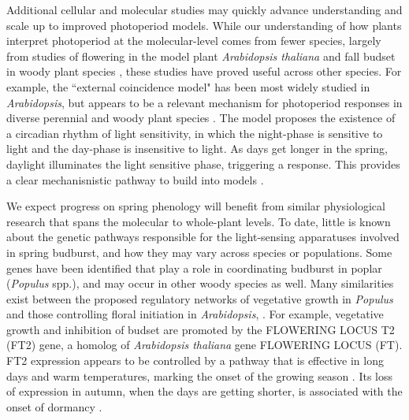\documentclass{article}
\begin{document}
\par Additional cellular and molecular studies may quickly advance understanding and scale up to improved photoperiod models. While our understanding of how plants interpret photoperiod at the molecular-level comes from fewer species, largely from studies of flowering in the model plant \emph{Arabidopsis thaliana} \citep[e.g.,][]{suarez2001} and fall budset in woody plant species \citep[e.g.,][]{Howe:1996}, these studies have proved useful across other species. For example, the ``external coincidence model" \citep[where plants sense light via blue light receptors and phytochromes, then interpret photoperiod through a coordinated response to light in relation to the time of day, see][]{lagercrantz2009} has been most widely studied in \emph{Arabidopsis}, but appears to be a relevant mechanism for photoperiod responses in diverse perennial and woody plant species \citep{Singh:2017,petterle2013,andres2012,kobayashi2007,davis2002,bastow2002,bunning1936}. The model proposes the existence of a circadian rhythm of light sensitivity, in which the night-phase is sensitive to light and the day-phase is insensitive to light. As days get longer in the spring, daylight illuminates the light sensitive phase, triggering a response. This provides a clear mechanisnistic pathway to build into models \citep{Burghardt2015}. 

\par We expect progress on spring phenology will benefit from similar physiological research that spans the molecular to whole-plant levels. To date, little is known about the genetic pathways responsible for the light-sensing apparatuses involved in spring budburst, and how they may vary across species or populations. Some genes have been identified that play a role in coordinating budburst in poplar (\emph{Populus} spp.), and may occur in other woody species as well. Many similarities exist between the proposed regulatory networks of vegetative growth in \emph{Populus} and those controlling floral initiation in \emph{Arabidopsis}, \citep{ding2016}. For example, vegetative growth and inhibition of budset are promoted by the FLOWERING LOCUS T2 (FT2) gene, a homolog of \emph{Arabidopsis thaliana} gene FLOWERING LOCUS (FT). FT2 expression appears to be controlled by a pathway that is effective in long days and warm temperatures, marking the onset of the growing season \citep{Hsu:2011}. Its loss of expression in autumn, when the days are getting shorter, is associated with the onset of dormancy \citep{glover2014}.
\end{document}
